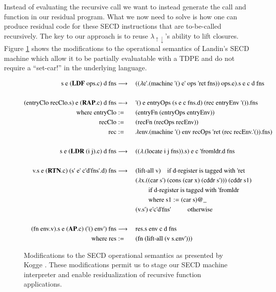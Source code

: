 \documentclass{article}
\theoremstyle{definition}
\newcommand{\ts}{\textquotesingle}
\newcommand{\mslang}{$\lambda_{\uparrow\downarrow}$}
\begin{document}
Instead of evaluating the recursive call we want to instead generate the call and function in our residual program. What we now need to solve is how one can produce residual code for these SECD instructions that are to-be-called recursively. The key to our approach is to reuse \mslang's ability to lift closures. Figure \ref{fig:secd_semantics_noset} shows the modifications to the operational semantics of Landin's SECD machine \cite{landin1964mechanical} which allow it to be partially evaluatable with a TDPE and do not require a ``set-car!'' in the underlying language.

\begin{figure}[ht!]
\centering
\begin{alignat}{5}
		\text{s e (} \mathbf{LDF} \text{ ops.c) d fns} & \longrightarrow \: && \text{(($\lambda$e{\ts}.(machine {\ts}() e{\ts} ops {\ts}ret fns)) ops.e).s e c d fns} \label{eq:secd_sem_ldf} \\
		\nonumber \\%
		\text{(entryClo recClo.s) e (} \mathbf{RAP}\text{.c) d fns} & \longrightarrow \: && \text{{\ts}() e entryOps (s e c fns.d) (rec entryEnv {\ts}()).fns} \\
		\text{where entryClo} & := && \text{(entryFn (entryOps entryEnv))} \nonumber \\
		\text{recClo} & := && \text{(recFn (recOps recEnv))} \nonumber \\
		\text{rec} & := && \text{$\lambda$env.(machine {\ts}() env recOps {\ts}ret (rec recEnv.{\ts}()).fns)} \nonumber
		\nonumber \\%
		\nonumber \\%
		\text{s e (} \mathbf{LDR} \text{ (i j).c) d fns} & \longrightarrow \: && \text{(($\lambda$.(locate i j fns)).s) e c {\ts}fromldr.d fns} \\
		\nonumber \\%
		\text{v.s e (} \mathbf{RTN}\text{.c) (s{\ts} e{\ts} c\ts  d\ts  fns\ts.d) fns} & \longrightarrow \:
		 && \text{(lift-all v)} 									\quad	\text{if d-register is tagged with {\ts}ret}	\\
		 & && \text{($\lambda$x.((car s{\ts}) (cons (car x) (cddr s{\ts}))) (cddr s1)	} \nonumber \\
		 & && \qquad\text{if d-register is tagged with {\ts}fromldr} \nonumber \\
		 & && \qquad\text{where s1} := \text{(car s)@\_} \nonumber \\
 		 & && \text{(v.s\ts)  e\ts  c\ts  d\ts  fns\ts}	\qquad\;\;\text{otherwise} \nonumber \\
 		\nonumber \\%
		\text{(fn env.v).s e (} \mathbf{AP}\text{.c) ({\ts}() env{\ts}) fns} & \longrightarrow \: && \text{res.s env c d fns} \\
		\text{where res} & := && \text{(fn (lift-all (v s.env{\ts})))} \nonumber
\end{alignat}
\caption{Modifications to the SECD operational semantics as presented by Kogge \cite{kogge1990architecture}. These modifications permit us to stage our SECD machine interpreter and enable residualization of recursive function applications.}
\label{fig:secd_semantics_noset}
\end{figure}
\end{document}
